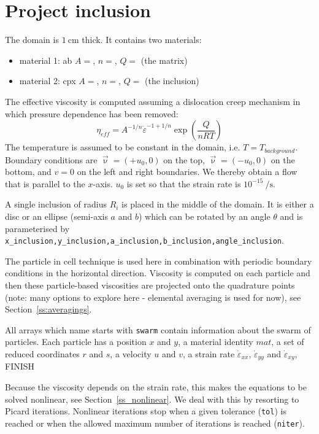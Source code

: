 \newpage
\section*{Project inclusion}

The domain is $1~\si{\cm}$ thick. It contains two materials:
\begin{itemize}
\item material 1: ab $A=$, $n=$, $Q=$ (the matrix)
\item material 2: cpx $A=$, $n=$, $Q=$ (the inclusion)
\end{itemize}
The effective viscosity is computed assuming a dislocation creep mechanism
in which pressure dependence has been removed:
\[
\eta_{eff} = A^{-1/n} \dot{\varepsilon}^{-1+1/n} \exp\left( \frac{Q}{nRT}\right)
\]
The temperature is assumed to be constant in the domain, i.e. $T=T_{background}$.
Boundary conditions are $\vec{\upnu}=(+u_0,0)$ on the top, $\vec{\upnu}=(-u_0,0)$ on the 
bottom, and $v=0$ on the left and right boundaries. We thereby obtain a flow 
that is parallel to the $x$-axis. $u_0$ is set so that the strain rate is $10^{-15}~\si{\per\second}$.

A single inclusion of radius $R_i$ is placed in the middle of the domain. It 
is either a disc or an ellipse (semi-axis $a$ and $b$) which can be rotated 
by an angle $\theta$ and is parameterised by
\lstinline{x_inclusion,y_inclusion,a_inclusion,b_inclusion,angle_inclusion}.
 

The particle in cell technique is used here in combination with 
periodic boundary conditions in the horizontal direction.
Viscosity is computed on each particle and then these particle-based 
viscosities are projected onto the quadrature points (note: many options to 
explore here - elemental averaging is used for now), see Section~\ref{ss:averagings}.

All arrays which name starts with \lstinline{swarm} contain information about 
the swarm of particles. 
Each particle has a position $x$ and $y$, a material identity $mat$, a 
set of reduced coordinates $r$ and $s$, a velocity $u$ and $v$, 
a strain rate $\dot{\varepsilon}_{xx}$, $\dot{\varepsilon}_{yy}$ and $\dot{\varepsilon}_{xy}$,
FINISH



Because the viscosity depends on the strain rate, this makes the equations 
to be solved nonlinear, see Section~\ref{ss_nonlinear}. We deal with this 
by resorting to Picard iterations. 
Nonlinear iterations stop when a given tolerance (\lstinline{tol}) is reached or when the 
allowed maximum number of iterations is reached (\lstinline{niter}).

